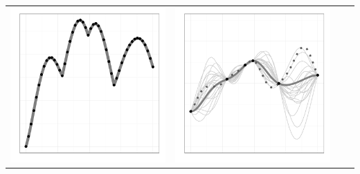 \documentclass[a4paper,natbib]{apa6}
\begin{document}
\begin{table}[h!]
\begin{tabular}{lccc}
\includegraphics[scale=0.2]{figure10.pdf} &  
\includegraphics[scale=0.2]{figure11.pdf}
\\


\end{tabular}
\end{table}
\end{document}
